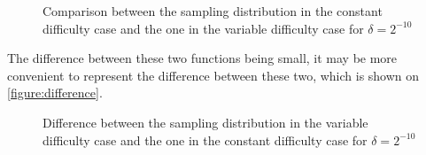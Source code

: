         \begin{figure}[ht]
          \centering
          \caption{Comparison between the sampling distribution in the constant difficulty case and the one in the variable difficulty case for \(\delta=2^{-10}\)}
          \label{figure:s}
        \end{figure}
        
        The difference between these two functions being small, it may be more convenient to represent the difference between these two, which is shown on \autoref{figure:difference}.
        
        \begin{figure}[ht]
          \centering
          \caption{Difference between the sampling distribution in the variable difficulty case and the one in the constant difficulty case for \(\delta=2^{-10}\)}
          \label{figure:difference}
        \end{figure}



